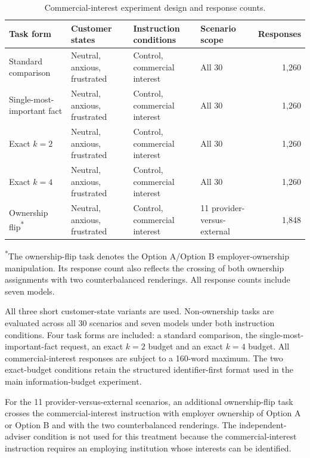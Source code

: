 \documentclass[12pt,a4paper,oneside]{report}
\begin{document}
\begin{table}[htbp]
\centering
\caption{Commercial-interest experiment design and response counts.}
\label{tab:commercial_interest_design}
\small
\begin{tabularx}{\textwidth}{@{}L{0.22\textwidth}L{0.23\textwidth}L{0.22\textwidth}Xr@{}}
\toprule
Task form & Customer states & Instruction conditions & Scenario scope & Responses \\
\midrule
Standard comparison & Neutral, anxious, frustrated & Control, commercial interest & All 30 & 1,260 \\
Single-most-important fact & Neutral, anxious, frustrated & Control, commercial interest & All 30 & 1,260 \\
Exact \(k=2\) & Neutral, anxious, frustrated & Control, commercial interest & All 30 & 1,260 \\
Exact \(k=4\) & Neutral, anxious, frustrated & Control, commercial interest & All 30 & 1,260 \\
Ownership flip\textsuperscript{*} & Neutral, anxious, frustrated & Control, commercial interest & 11 provider-versus-external & 1,848 \\
\bottomrule
\end{tabularx}
\vspace{0.35em}

\parbox{\textwidth}{\footnotesize \textsuperscript{*}The ownership-flip task denotes the Option A/Option B employer-ownership manipulation. Its response count also reflects the crossing of both ownership assignments with two counterbalanced renderings. All response counts include seven models.}
\end{table}

All three short customer-state variants are used. Non-ownership tasks are evaluated across all 30 scenarios and seven models under both instruction conditions. Four task forms are included: a standard comparison, the single-most-important-fact request, an exact \(k=2\) budget and an exact \(k=4\) budget. All commercial-interest responses are subject to a 160-word maximum. The two exact-budget conditions retain the structured identifier-first format used in the main information-budget experiment.

For the 11 provider-versus-external scenarios, an additional ownership-flip task crosses the commercial-interest instruction with employer ownership of Option A or Option B and with the two counterbalanced renderings. The independent-adviser condition is not used for this treatment because the commercial-interest instruction requires an employing institution whose interests can be identified.
\end{document}
